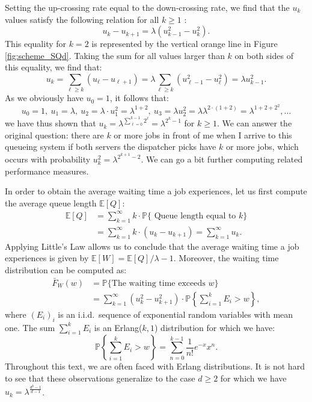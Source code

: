 \documentclass[12pt]{report}
\renewcommand{\P}{\mathbb{P}}
\newcommand{\E}{\mathbb{E}}
\renewcommand{\P}{\mathbb{P}}
\begin{document}
Setting the up-crossing rate equal to the down-crossing rate, we find that the $u_k$ values satisfy the following relation for all $k \geq 1$ :
$$
u_{k} - u_{k+1} = \lambda (u_{k-1}^2 - u_{k}^2).
$$
This equality for $k=2$ is represented by the vertical orange line in Figure \ref{fig:scheme_SQd}. Taking the sum for all values larger than $k$ on both sides of this equality, we find that:
$$
u_k = \sum_{\ell \geq k} (u_\ell - u_{\ell+1}) = \lambda \sum_{\ell \geq k} (u_{\ell-1}^2 - u_\ell^2) = \lambda u_{k-1}^2.
$$
As we obviously have $u_0 = 1$, it follows that:
$$
u_0 = 1,\ u_1 = \lambda,\ u_2 = \lambda \cdot u_1^2 = \lambda^{1+2},\ u_3 = \lambda u_2^2 = \lambda \lambda^{2\cdot (1+2)} = \lambda^{1+2+2^2}, \dots
$$
we have thus shown that $u_k = \lambda^{\sum_{\ell=0}^{k-1} 2^\ell} = \lambda^{2^{k}-1}$ for $k \geq 1$. We can answer the original question: there are $k$ or more jobs in front of me when I arrive to this queueing system if both servers the dispatcher picks have $k$ or more jobs, which occurs with probability $u_k^2 = \lambda^{2^{k+1} - 2}$. We can go a bit further computing related performance measures.

In order to obtain the average waiting time a job experiences, let us first compute the average queue length $\E[Q]$:
\begin{align*}
	\E[Q] &= \sum_{k=1}^\infty k \cdot \P\{ \mbox{ Queue length equal to } k \}\\
	&=\sum_{k=1}^\infty k \cdot (u_k - u_{k+1})
	=\sum_{k=1}^\infty u_k.
\end{align*}
Applying Little's Law allows us to conclude that the average waiting time a job experiences is given by $\E[W] = \E[Q] / \lambda - 1$. 
Moreover, the waiting time distribution can be computed as:
\begin{align*}
	\bar F_W(w)
	&= \mathbb{P} \{ \mbox{The waiting time exceeds } w \}\\
	&= \sum_{k=1}^\infty (u_k^2 - u_{k+1}^2) \cdot \mathbb{P}\left\{ \sum_{i=1}^k E_i > w \right\},
\end{align*}
where $(E_i)_i$ is an i.i.d.~sequence of exponential random variables with mean one. The sum $\sum_{i=1}^k E_i$ is an Erlang($k,1$) distribution for which we have: 
$$
\mathbb{P}\left\{ \sum_{i=1}^k E_i > w \right\} = \sum_{n=0}^{k-1} \frac{1}{n!} e^{-x} x^n.
$$
Throughout this text, we are often faced with Erlang distributions.
It is not hard to see that these observations generalize to the case $d \geq 2$ for which we have $u_k  = \lambda^{\frac{d^{k}-1}{d-1}}$.
\end{document}
